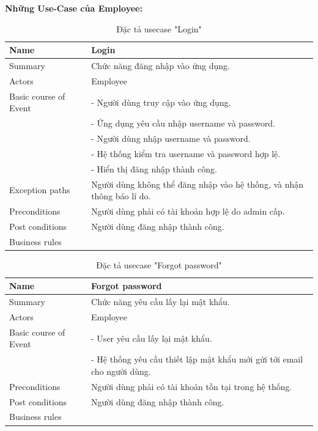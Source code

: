 \documentclass[a4paper]{article}
\begin{document}
\noindent
\textbf{Những Use-Case của Employee:}\\
\begin{table}[!h]
    \centering
    \begin{tabular}{|m{3.2cm}|m{10.5cm}|}
        \hline
        Name & Login\\
        \hline
        Summary & Chức năng đăng nhập vào ứng dụng.\\
        \hline
        Actors & Employee\\
        \hline
        Basic course of Event & -	Người dùng truy cập vào ứng dụng.\\
&-	Ứng dụng yêu cầu nhập username và password.\\
&-	Người dùng nhập username và password.\\
&-	Hệ thống kiểm tra username và password hợp lệ.\\
&-	Hiển thị đăng nhập thành công.\\
        \hline
        Exception paths & Người dùng không thể đăng nhập vào hệ thống, và nhận thông báo lí do.\\
        \hline
        Preconditions & Người dùng phải có tài khoản hợp lệ do admin cấp.\\
        \hline
        Post conditions & Người dùng đăng nhập thành công.\\
        \hline
        Business rules & \\
        \hline
    \end{tabular}
    \caption{Đặc tả usecase "Login"}
\end{table}
\begin{table}[!h]
    \centering
    \begin{tabular}{|m{3.2cm}|m{10.5cm}|}
        \hline
        Name & Forgot password\\
        \hline
        Summary & Chức năng yêu cầu lấy lại mật khẩu.\\
        \hline
        Actors & Employee\\
        \hline
        Basic course of Event & -	User yêu cầu lấy lại mật khẩu.\\
&-	Hệ thống yêu cầu thiết lập mật khẩu mới gửi tới email cho người dùng.\\
        \hline
        Preconditions & Người dùng phải có tài khoản tồn tại trong hệ thống.\\
        \hline
        Post conditions & Người dùng đăng nhập thành công.\\
        \hline
        Business rules & \\
        \hline
    \end{tabular}
    \caption{Đặc tả usecase "Forgot password"}
\end{table}
\end{document}

